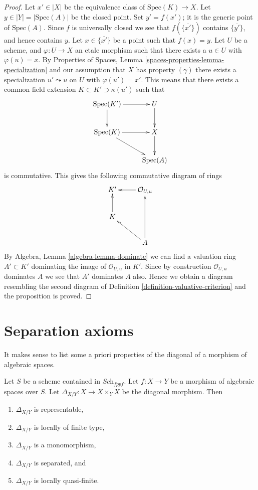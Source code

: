 \begin{proof}
\medskip\noindent
Let $x' \in |X|$ be the equivalence class of
$\text{Spec}(K) \to X$. Let $y \in |Y| = |\text{Spec}(A)|$ be
the closed point. Set $y' = f(x')$; it is the generic point of
$\text{Spec}(A)$. Since $f$ is universally closed we see that
$f(\overline{\{x'\}})$ contains $\overline{\{y'\}}$, and hence
contains $y$. Let $x \in \overline{\{x'\}}$ be a point such that
$f(x) = y$. Let $U$ be a scheme, and $\varphi : U \to X$
an etale morphism such that there exists a $u \in U$ with
$\varphi(u) = x$. By
Properties of Spaces, Lemma \ref{spaces-properties-lemma-specialization}
and our assumption that $X$ has property $(\gamma)$
there exists a specialization $u' \leadsto u$ on $U$ with $\varphi(u') = x'$.
This means that there exists a common field extension
$K \subset K' \supset \kappa(u')$ such that
$$
\xymatrix{
\text{Spec}(K') \ar[r] \ar[d] & U \ar[d] \\
\text{Spec}(K) \ar[r] \ar[rd] & X \ar[d] \\
 & \text{Spec}(A)
}
$$
is commutative. This gives the following commutative diagram of rings
$$
\xymatrix{
K' & \mathcal{O}_{U, u} \ar[l] \\
K \ar[u] & \\
 & A \ar[lu] \ar[uu]
}
$$
By
Algebra, Lemma \ref{algebra-lemma-dominate}
we can find a valuation ring $A' \subset K'$ dominating the image of
$\mathcal{O}_{U, u}$ in $K'$. Since by construction $\mathcal{O}_{U, u}$
dominates $A$ we see that $A'$ dominates $A$ also. Hence we obtain a diagram
resembling the second diagram of
Definition \ref{definition-valuative-criterion}
and the proposition is proved.
\end{proof}













\section{Separation axioms}
\label{section-separation-axioms}

\noindent
It makes sense to list some a priori properties of the diagonal of
a morphism of algebraic spaces.

\begin{lemma}
\label{lemma-properties-diagonal}
Let $S$ be a scheme contained in $\textit{Sch}_{fppf}$.
Let $f : X \to Y$ be a morphism of algebraic spaces over $S$.
Let $\Delta_{X/Y} : X \to X \times_Y X$ be the diagonal morphism.
Then
\begin{enumerate}
\item $\Delta_{X/Y}$ is representable,
\item $\Delta_{X/Y}$ is locally of finite type,
\item $\Delta_{X/Y}$ is a monomorphism,
\item $\Delta_{X/Y}$ is separated, and
\item $\Delta_{X/Y}$ is locally quasi-finite.
\end{enumerate}
\end{lemma}

